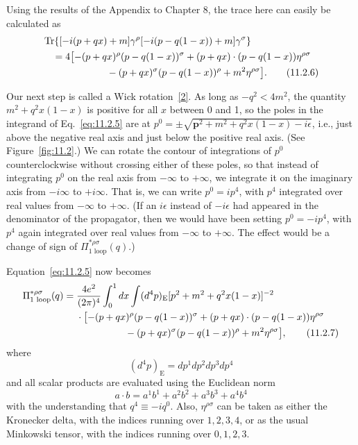 Using the results of the Appendix to Chapter 8, the trace here can easily
be calculated as
\begin{align}
  &\operatorname{Tr}\{[-i(\sl{p}+\sl{q}x)+m]\gamma^\rho
  [-i(\sl{p}-\sl{q}(1-x))+m]\gamma^\sigma\}\notag\\
  &\quad=4\bigl[-(p+qx)^\rho(p-q(1-x))^\sigma
  +(p+qx)\cdot(p-q(1-x))\eta^{\rho\sigma}\notag\\
  &\hspace{6.6em}-(p+qx)^\sigma(p-q(1-x))^\rho+m^2\eta^{\rho\sigma}\bigr].
  \tag{11.2.6}\label{eq:11.2.6}
\end{align}

Our next step is called a Wick rotation~\hyperref[ref:11.2]{[2]}. As long as $-q^2<4m^2$, the
quantity $m^2+q^2x(1-x)$ is positive for all $x$ between 0 and 1, so the
poles in the integrand of Eq.~\eqref{eq:11.2.5} are at
$p^0=\pm\sqrt{\mathbf p^2+m^2+q^2x(1-x)-i\epsilon}$, i.e., just above the
negative real axis and just below the positive real axis. (See Figure~\ref{fig:11.2}.)
We can rotate the contour of integrations of $p^0$ counterclockwise without
crossing either of these poles, so that instead of integrating $p^0$ on the
real axis from $-\infty$ to $+\infty$, we integrate it on the imaginary axis
from $-i\infty$ to $+i\infty$. That is, we can write $p^0=i p^4$, with $p^4$
integrated over real values from $-\infty$ to $+\infty$. (If an $i\epsilon$
instead of $-i\epsilon$ had appeared in the denominator of the propagator,
then we would have been setting $p^0=-ip^4$, with $p^4$ again integrated
over real values from $-\infty$ to $+\infty$. The effect would be a change
of sign of $\Pi_{\text{1 loop}}^{*\rho\sigma}(q)$.)

\clearpage


Equation~\eqref{eq:11.2.5} now becomes
\begin{align}
  \Pi_{\text{1 loop}}^{*\rho\sigma}(q)
  ={}&\frac{4e^2}{(2\pi)^4}\int_0^1dx\int(d^4p)_{\mathrm E}
  [p^2+m^2+q^2x(1-x)]^{-2}\notag\\
  &\cdot\bigl[-(p+qx)^\rho(p-q(1-x))^\sigma
  +(p+qx)\cdot(p-q(1-x))\eta^{\rho\sigma}\notag\\
  &\hspace{5em}-(p+qx)^\sigma(p-q(1-x))^\rho+m^2\eta^{\rho\sigma}\bigr],
  \tag{11.2.7}\label{eq:11.2.7}
\end{align}
where
\[
  (d^4p)_{\mathrm E}=dp^1dp^2dp^3dp^4
\]
and all scalar products are evaluated using the Euclidean norm
\[
  a\cdot b=a^1b^1+a^2b^2+a^3b^3+a^4b^4
\]
with the understanding that $q^4\equiv-iq^0$. Also, $\eta^{\rho\sigma}$ can
be taken as either the Kronecker delta, with the indices running over
$1,2,3,4$, or as the usual Minkowski tensor, with the indices running over
$0,1,2,3$.

